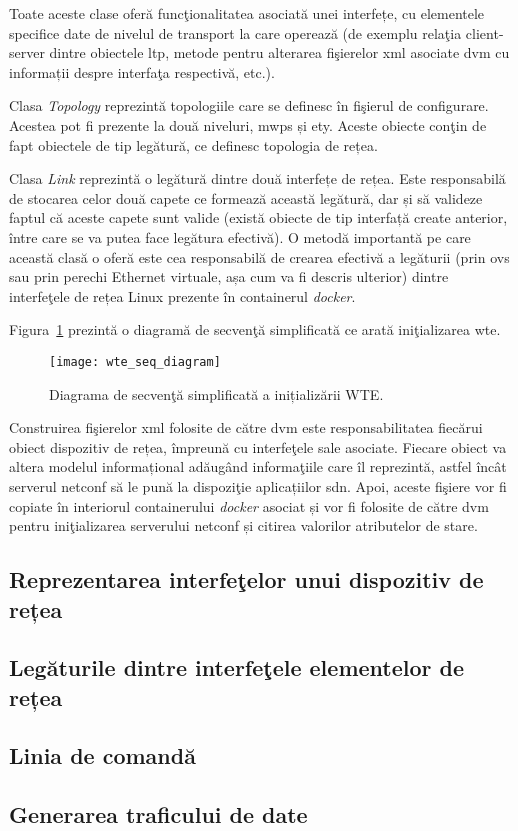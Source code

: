 Toate aceste clase oferă funcţionalitatea asociată unei interfețe, cu elementele specifice date de nivelul de transport la care operează (de exemplu relaţia client-server dintre obiectele \gls{ltp}, metode pentru alterarea fişierelor \gls{xml} asociate \gls{dvm} cu informații despre interfaţa respectivă, etc.).

Clasa \textit{Topology} reprezintă topologiile care se definesc în fişierul de configurare. Acestea pot fi prezente la două niveluri, \gls{mwps} și \gls{ety}. Aceste obiecte conţin de fapt obiectele de tip legătură, ce definesc topologia de rețea.

Clasa \textit{Link} reprezintă o legătură dintre două interfețe de rețea. Este responsabilă de stocarea celor două capete ce formează această legătură, dar și să valideze faptul că aceste capete sunt valide (există obiecte de tip interfață create anterior, între care se va putea face legătura efectivă). O metodă importantă pe care această clasă o oferă este cea responsabilă de crearea efectivă a legăturii (prin \gls{ovs} sau prin perechi Ethernet virtuale, așa cum va fi descris ulterior) dintre interfeţele de rețea Linux prezente în containerul \textit{docker}.

Figura~\ref{fig:wte_seq_diagram} prezintă o diagramă de secvenţă simplificată ce arată iniţializarea \gls{wte}.

\begin{figure}[h]
	\centering
	\texttt{[image: wte\_seq\_diagram]}
	\caption{Diagrama de secvenţă simplificată a inițializării WTE.}
	\label{fig:wte_seq_diagram}
\end{figure}

Construirea fişierelor \gls{xml} folosite de către \gls{dvm} este responsabilitatea fiecărui obiect dispozitiv de rețea, împreună cu interfeţele sale asociate. Fiecare obiect va altera modelul informațional adăugând informaţiile care îl reprezintă, astfel încât serverul \gls{netconf} să le pună la dispoziţie aplicațiilor \gls{sdn}. Apoi, aceste fişiere vor fi copiate în interiorul containerului \textit{docker} asociat și vor fi folosite de către \gls{dvm} pentru iniţializarea serverului \gls{netconf} și citirea valorilor atributelor de stare.

\subsection{Reprezentarea interfeţelor unui dispozitiv de rețea}

\subsection{Legăturile dintre interfeţele elementelor de rețea}

\subsection{Linia de comandă}

\subsection{Generarea traficului de date}